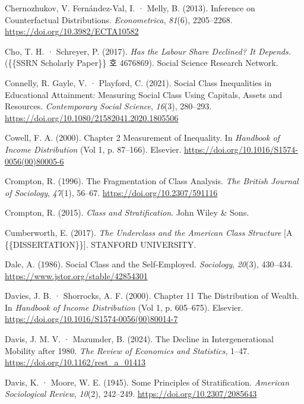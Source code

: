 \documentclass[
  letterpaper,
  DIV=11,
  numbers=noendperiod]{scrartcl}
\newlength{\cslhangindent}
\newenvironment{CSLReferences}[2] %
 {\begin{list}{}{%
  \setlength{\itemindent}{0pt}
  \setlength{\leftmargin}{0pt}
  \setlength{\parsep}{0pt}
  \ifodd #1
   \setlength{\leftmargin}{\cslhangindent}
   \setlength{\itemindent}{-1\cslhangindent}
  \fi
  \setlength{\itemsep}{#2\baselineskip}}}
 {\end{list}}
\begin{document}
\begin{CSLReferences}{1}{0}
Chernozhukov, V. Fernández-Val, I. · Melly, B. (2013). Inference on
{Counterfactual Distributions}. \emph{Econometrica}, \emph{81}(6),
2205--2268. \url{https://doi.org/10.3982/ECTA10582}

Cho, T. H. · Schreyer, P. (2017). \emph{Has the {Labour Share Declined}?
{It} Depends.} (\{\{SSRN Scholarly Paper\}\} 호 4676869). Social Science
Research Network.

Connelly, R. Gayle, V. · Playford, C. (2021). Social Class Inequalities
in Educational Attainment: Measuring Social Class Using Capitals, Assets
and Resources. \emph{Contemporary Social Science}, \emph{16}(3),
280--293. \url{https://doi.org/10.1080/21582041.2020.1805506}

Cowell, F. A. (2000). Chapter 2 {Measurement} of Inequality. In
\emph{Handbook of {Income Distribution}} (Vol 1, p. 87--166). Elsevier.
\url{https://doi.org/10.1016/S1574-0056(00)80005-6}

Crompton, R. (1996). The {Fragmentation} of {Class Analysis}. \emph{The
British Journal of Sociology}, \emph{47}(1), 56--67.
\url{https://doi.org/10.2307/591116}

Crompton, R. (2015). \emph{Class and {Stratification}}. John Wiley \&
Sons.

Cumberworth, E. (2017). \emph{The Underclass and the {American} Class
Structure} {[}A \{\{DISSERTATION\}\}{]}. STANFORD UNIVERSITY.

Dale, A. (1986). Social {Class} and the {Self-Employed}.
\emph{Sociology}, \emph{20}(3), 430--434.
\url{https://www.jstor.org/stable/42854301}

Davies, J. B. · Shorrocks, A. F. (2000). Chapter 11 {The} Distribution
of Wealth. In \emph{Handbook of {Income Distribution}} (Vol 1, p.
605--675). Elsevier. \url{https://doi.org/10.1016/S1574-0056(00)80014-7}

Davis, J. M. V. · Mazumder, B. (2024). The {Decline} in
{Intergenerational Mobility} after 1980. \emph{The Review of Economics
and Statistics}, 1--47. \url{https://doi.org/10.1162/rest_a_01413}

Davis, K. · Moore, W. E. (1945). Some {Principles} of {Stratification}.
\emph{American Sociological Review}, \emph{10}(2), 242--249.
\url{https://doi.org/10.2307/2085643}


\end{CSLReferences}
\end{document}
